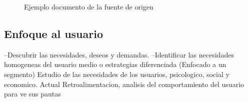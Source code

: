 \begin{figure}[ht]
\centering
{}
\caption{Ejemplo documento de la fuente de origen}
\end{figure}
\begin{comment}
    
\end{co}
\begin{itemize}

    \item Informacion precisa
    \item Datos contrastados
\end{itemize}
\end{comment}

\subsection{Enfoque al usuario}
--Descubrir las necesidades, deseos y demandas.
--Identificar las necesidades homogeneas del usuario medio o estrategias diferenciada (Enfocado a un segmento)
Estudio de las necesidades de los usuarios, psicologico, social y economico.
Actual
Retroalimentacion, analisis del comportamiento del usuario para ve sus pautas

